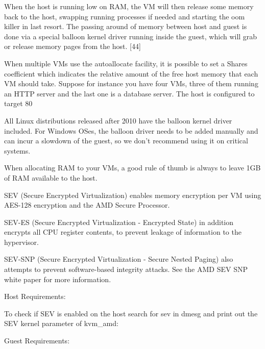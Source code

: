 When the host is running low on RAM, the VM will then release some memory back to the host, swapping running processes if needed and starting the oom killer in last resort. The passing around of memory between host and guest is done via a special balloon kernel driver running inside the guest, which will grab or release memory pages from the host. [44]

When multiple VMs use the autoallocate facility, it is possible to set a Shares coefficient which indicates the relative amount of the free host memory that each VM should take. Suppose for instance you have four VMs, three of them running an HTTP server and the last one is a database server. The host is configured to target 80%

All Linux distributions released after 2010 have the balloon kernel driver included. For Windows OSes, the balloon driver needs to be added manually and can incur a slowdown of the guest, so we don’t recommend using it on critical systems.

When allocating RAM to your VMs, a good rule of thumb is always to leave 1GB of RAM available to the host.

SEV (Secure Encrypted Virtualization) enables memory encryption per VM using AES-128 encryption and the AMD Secure Processor.

SEV-ES (Secure Encrypted Virtualization - Encrypted State) in addition encrypts all CPU register contents, to prevent leakage of information to the hypervisor.

SEV-SNP (Secure Encrypted Virtualization - Secure Nested Paging) also attempts to prevent software-based integrity attacks. See the AMD SEV SNP white paper for more information.

Host Requirements:

To check if SEV is enabled on the host search for sev in dmesg and print out the SEV kernel parameter of kvm_amd:

Guest Requirements:

